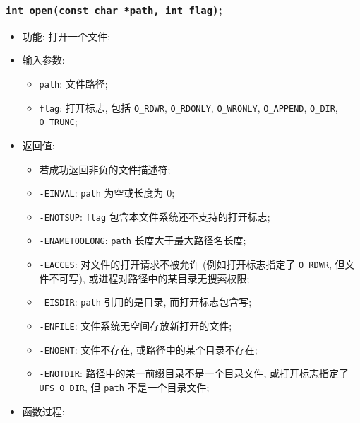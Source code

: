 \documentclass[nofonts, titlepage]{ctexart}
\begin{document}
  \subsubsection[\texttt{open}]{\texttt{int open(const char *path, int flag)};}
  \begin{itemize}
\item
  功能: 打开一个文件;
\item
  输入参数:

  \begin{itemize}
  \item
    \texttt{path}: 文件路径;
  \item
    \texttt{flag}: 打开标志, 包括 \texttt{O\_RDWR}, \texttt{O\_RDONLY},
    \texttt{O\_WRONLY}, \texttt{O\_APPEND}, \texttt{O\_DIR},
    \texttt{O\_TRUNC};
  \end{itemize}
\item
  返回值:

  \begin{itemize}
  \item
    若成功返回非负的文件描述符;
  \item
    \texttt{-EINVAL}: \texttt{path} 为空或长度为 0;
  \item
    \texttt{-ENOTSUP}: \texttt{flag} 包含本文件系统还不支持的打开标志;
  \item
    \texttt{-ENAMETOOLONG}: \texttt{path} 长度大于最大路径名长度;
  \item
    \texttt{-EACCES}: 对文件的打开请求不被允许 (例如打开标志指定了
    \texttt{O\_RDWR}, 但文件不可写), 或进程对路径中的某目录无搜索权限;
  \item
    \texttt{-EISDIR}: \texttt{path} 引用的是目录, 而打开标志包含写;
  \item
    \texttt{-ENFILE}: 文件系统无空间存放新打开的文件;
  \item
    \texttt{-ENOENT}: 文件不存在, 或路径中的某个目录不存在;
  \item
    \texttt{-ENOTDIR}: 路径中的某一前缀目录不是一个目录文件,
    或打开标志指定了 \texttt{UFS\_O\_DIR}, 但 \texttt{path}
    不是一个目录文件;
  \end{itemize}
\item
  函数过程:


\end{itemize}
\end{document}
